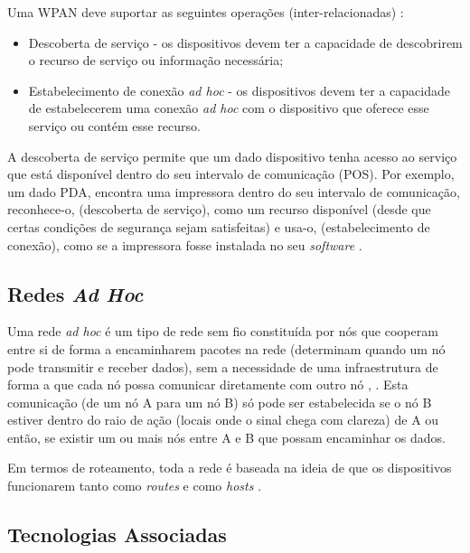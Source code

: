 \documentclass[conference]{IEEEtran}
\begin{document}
Uma WPAN deve suportar as seguintes operações (inter-relacionadas) \cite{prasad2004ofdm}:

\begin{itemize}

 \item Descoberta de serviço - os dispositivos devem ter a capacidade de descobrirem o recurso de serviço ou informação necessária;
 \item Estabelecimento de conexão \textit{ad hoc} - os dispositivos devem ter a capacidade de estabelecerem uma conexão \textit{ad hoc} com o dispositivo que oferece esse serviço ou contém esse recurso.
 
\end{itemize}

A descoberta de serviço permite que um dado dispositivo tenha acesso ao serviço que está disponível dentro do seu intervalo de comunicação (POS).
Por exemplo, um dado PDA, encontra uma impressora dentro do seu intervalo de comunicação, reconhece-o, (descoberta de serviço), como um recurso disponível (desde que certas condições de segurança sejam satisfeitas) e usa-o, (estabelecimento de conexão), como se a impressora fosse instalada no seu \textit{software} \cite{prasad2004ofdm}.


\subsection{Redes \textit{Ad Hoc}} \label{redes_ad_hoc}

Uma rede \textit{ad hoc} é um tipo de rede sem fio constituída por nós que cooperam entre si de forma a encaminharem pacotes na rede (determinam quando um nó pode transmitir e receber dados), sem a necessidade de uma infraestrutura de forma a que cada nó possa comunicar diretamente com outro nó \cite{salonidis2005distributed}, \cite{rubinstein2002qualidade}. 
Esta comunicação (de um nó A para um nó B) só pode ser estabelecida se o nó B estiver dentro do raio de ação (locais onde o sinal chega com clareza) de A ou então, se existir um ou mais nós entre A e B que possam encaminhar os dados.

Em termos de roteamento, toda a rede é baseada na ideia de que os dispositivos funcionarem tanto como \textit{routes} e como \textit{hosts} \cite{prasad2004ofdm}.


\subsection{Tecnologias Associadas}
\end{document}
